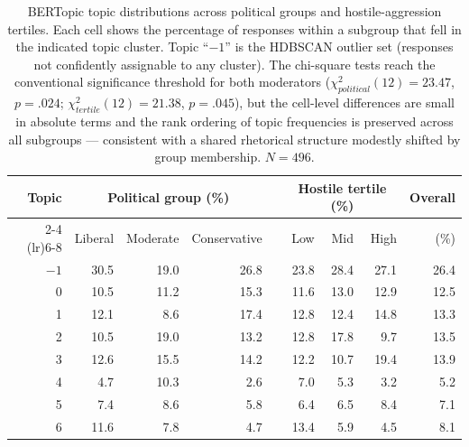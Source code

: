\begin{table}[htbp]
  \centering
  \caption{BERTopic topic distributions across political groups and hostile-aggression tertiles. Each cell shows the percentage of responses within a subgroup that fell in the indicated topic cluster. Topic ``$-1$'' is the HDBSCAN outlier set (responses not confidently assignable to any cluster). The chi-square tests reach the conventional significance threshold for both moderators ($\chi^2_\textit{political}(12) = 23.47$, $p = .024$; $\chi^2_\textit{tertile}(12) = 21.38$, $p = .045$), but the cell-level differences are small in absolute terms and the rank ordering of topic frequencies is preserved across all subgroups --- consistent with a shared rhetorical structure modestly shifted by group membership. $N = 496$.}
  \label{tab:nlp_political_moderation}
  \small
  \begin{tabular}{rrrrrrrrr}
    \toprule
    Topic & \multicolumn{3}{c}{Political group (\%)} & & \multicolumn{3}{c}{Hostile tertile (\%)} & Overall \\
    \cmidrule(lr){2-4} \cmidrule(lr){6-8}
          & Liberal & Moderate & Conservative & & Low & Mid & High & (\%) \\
    \midrule
    $-1$  & 30.5 & 19.0 & 26.8 & & 23.8 & 28.4 & 27.1 & 26.4 \\
    0     & 10.5 & 11.2 & 15.3 & & 11.6 & 13.0 & 12.9 & 12.5 \\
    1     & 12.1 &  8.6 & 17.4 & & 12.8 & 12.4 & 14.8 & 13.3 \\
    2     & 10.5 & 19.0 & 13.2 & & 12.8 & 17.8 &  9.7 & 13.5 \\
    3     & 12.6 & 15.5 & 14.2 & & 12.2 & 10.7 & 19.4 & 13.9 \\
    4     &  4.7 & 10.3 &  2.6 & &  7.0 &  5.3 &  3.2 &  5.2 \\
    5     &  7.4 &  8.6 &  5.8 & &  6.4 &  6.5 &  8.4 &  7.1 \\
    6     & 11.6 &  7.8 &  4.7 & & 13.4 &  5.9 &  4.5 &  8.1 \\
    \bottomrule
  \end{tabular}
\end{table}
